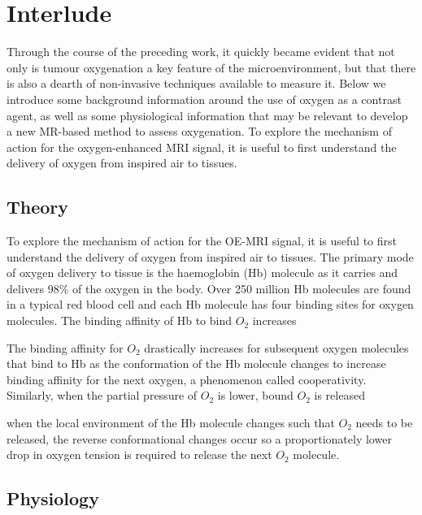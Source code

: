 
\chapter{Interlude}
\label{ch:interlude}
Through the course of the preceding work, it quickly became evident that not only is tumour oxygenation a key feature of the microenvironment, but that there is also a dearth of non-invasive techniques available to measure it.
Below we introduce some background information around the use of oxygen as a contrast agent, as well as some physiological information that may be relevant to develop a new MR-based method to assess oxygenation.
To explore the mechanism of action for the oxygen-enhanced MRI signal, it is useful to first understand the delivery of oxygen from inspired air to tissues.

 \section{Theory}
 To explore the mechanism of action for the OE-MRI signal, it is useful to first understand the delivery of oxygen from inspired air to tissues. 
 The primary mode of oxygen delivery to tissue is the haemoglobin (\acs{Hb}) molecule as it carries and delivers 98\% of the oxygen in the body. 
 Over 250 million \acs{Hb} molecules are found in a typical red blood cell and each \acs{Hb} molecule has four binding sites for oxygen molecules. 
 The binding affinity of \acs{Hb} to bind ${O_2}$ increases 

 The binding affinity for ${O_2}$ drastically increases for subsequent oxygen molecules that bind to \acs{Hb} as the conformation of the \acs{Hb} molecule changes to increase binding affinity for the next oxygen, a phenomenon called cooperativity. 
 Similarly, when the partial pressure of ${O_2}$ is lower, bound ${O_2}$ is released 

 when the local environment of the \acs{Hb} molecule changes such that ${O_2}$ needs to be released, the reverse conformational changes occur so a proportionately lower drop in oxygen tension is required to release the next ${O_2}$ molecule. 

 \section{Physiology}

